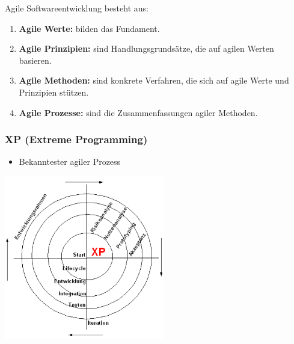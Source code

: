 Agile Softwareentwicklung besteht aus:
\begin{enumerate}
	\item \textbf{Agile Werte:} bilden das Fundament.
	\item \textbf{Agile Prinzipien:} sind Handlungsgrundsätze, die auf agilen Werten basieren.
	\item \textbf{Agile Methoden:} sind konkrete Verfahren, die sich auf agile Werte und Prinzipien stützen.
	\item \textbf{Agile Prozesse:} sind die Zusammenfassungen agiler Methoden.
	\\ 
\end{enumerate}

\begin{multicols}{2}
\subsubsection{XP (Extreme Programming)}
\begin{minipage}{10cm}
	\begin{itemize}
		\item Bekanntester agiler Prozess
	\end{itemize}
\end{minipage}
\begin{minipage}{5cm} %
	\includegraphics[width=7cm]{images/extreme_programming.png}
\end{minipage}


\end{multicols}
